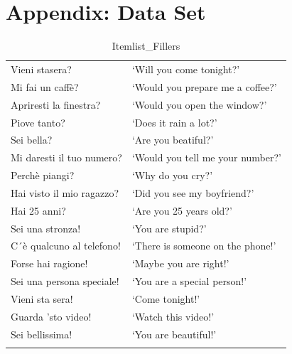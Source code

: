 \documentclass[output=paper]{langsci/langscibook}
\begin{document}
\pagebreak

\section*{Appendix: Data Set}




\begin{table}
\begin{tabularx}{\textwidth}{ll}
\lsptoprule
Vieni stasera? & `Will you come tonight?’                    \\
Mi fai un caffè? & `Would you prepare me a coffee?’          \\
Apriresti la finestra? & `Would you open the window?’        \\
Piove tanto? & `Does it rain a lot?’                          \\
Sei bella? & `Are you beatiful?’                             \\
Mi daresti il tuo numero? & `Would you tell me your number?’ \\
Perchè piangi? & `Why do you cry?’                           \\
Hai visto il mio ragazzo? & `Did you see my boyfriend?’     \\
Hai 25 anni? & `Are you 25 years old?’                       \\
Sei una stronza! & `You are stupid?’                         \\
C´è qualcuno al telefono! & `There is someone on the phone!’ \\
Forse hai ragione! & `Maybe you are right!’                  \\
Sei una persona speciale! & `You are a special person!’      \\
Vieni sta sera! & `Come tonight!’                            \\
Guarda 'sto video! & `Watch this video!’                     \\
Sei bellissima! & `You are beautiful!’          			\\            
\lspbottomrule
\end{tabularx}
\caption{Itemlist\_Fillers}
\label{tab:kel:2}
\end{table}
\end{document}
